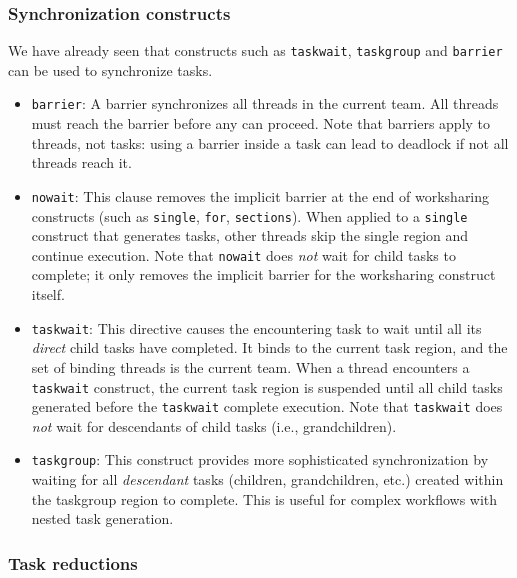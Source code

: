 \subsubsection{Synchronization constructs}

We have already seen that constructs such as \texttt{taskwait}, \texttt{taskgroup} and \texttt{barrier} can be used to synchronize tasks.

\begin{itemize}
    \item \texttt{barrier}: A barrier synchronizes all threads in the current team. All threads must reach the barrier before any can proceed. Note that barriers apply to threads, not tasks: using a barrier inside a task can lead to deadlock if not all threads reach it.
    
    \item \texttt{nowait}: This clause removes the implicit barrier at the end of worksharing constructs (such as \texttt{single}, \texttt{for}, \texttt{sections}). When applied to a \texttt{single} construct that generates tasks, other threads skip the single region and continue execution. Note that \texttt{nowait} does \textit{not} wait for child tasks to complete; it only removes the implicit barrier for the worksharing construct itself.
    
    \item \texttt{taskwait}: This directive causes the encountering task to wait until all its \textit{direct} child tasks have completed. It binds to the current task region, and the set of binding threads is the current team. When a thread encounters a \texttt{taskwait} construct, the current task region is suspended until all child tasks generated before the \texttt{taskwait} complete execution. Note that \texttt{taskwait} does \textit{not} wait for descendants of child tasks (i.e., grandchildren).
    
    \item \texttt{taskgroup}: This construct provides more sophisticated synchronization by waiting for all \textit{descendant} tasks (children, grandchildren, etc.) created within the taskgroup region to complete. This is useful for complex workflows with nested task generation.
\end{itemize}

\subsubsection{Task reductions}

